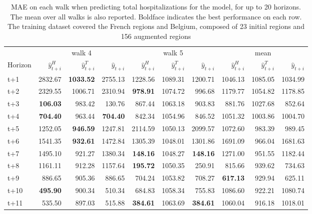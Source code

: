 \begin{table}[H]
\centering
\caption{MAE on each walk when predicting total hospitalizations for the model, for up to 20 horizons. The mean over all walks is also reported. Boldface indicates the best performance on each row. The training dataset covered the French regions and Belgium, composed of 23 initial regions and 156 augmented regions }
\label{tab:MAE_walk_assemble}
\begin{tabular}{lrrrrrrrrr}
\toprule
 & \multicolumn{3}{c}{walk 4} & \multicolumn{3}{c}{walk 5} & \multicolumn{3}{c}{mean} 
\\

\cmidrule(lr){2-4} \cmidrule(lr){5-7} \cmidrule(lr){8-10} 
Horizon & $\hat{y}_{t+i}^H$ & $\hat{y}_{t+i}^T$ & $\hat{y}_{t+i}$ & $\hat{y}_{t+i}^H$ & $\hat{y}_{t+i}^T$ & $\hat{y}_{t+i}$ & $\hat{y}_{t+i}^H$ & $\hat{y}_{t+i}^T$ & $\hat{y}_{t+i}$ \\
\midrule
t+1  & 2832.67  & \textbf{1033.52}  & 2755.13  & 1228.56  & 1089.31  & 1200.71  & 1046.13  & 1085.05  & 1034.99  \\
t+2  & 2329.55  & 1006.71  & 2310.94  & \textbf{978.91}  & 1074.72  & 996.68  & 1179.77  & 1054.82  & 1178.85  \\
t+3  & \textbf{106.03}  & 983.42  & 130.76  & 867.44  & 1063.18  & 903.83  & 881.76  & 1027.68  & 852.64  \\
t+4  & \textbf{704.40}  & 963.44  & \textbf{704.40}  & 842.34  & 1054.96  & 846.52  & 1051.32  & 1003.86  & 1004.70  \\
t+5  & 1252.05  & \textbf{946.59}  & 1247.81  & 2114.59  & 1050.13  & 2099.57  & 1072.60  & 983.39  & 989.45  \\
t+6  & 1541.35  & \textbf{932.61}  & 1472.84  & 1305.39  & 1048.01  & 1301.86  & 1691.09  & 966.04  & 1681.63  \\
t+7  & 1495.10  & 921.27  & 1380.34  & \textbf{148.16}  & 1048.27  & \textbf{148.16}  & 1271.00  & 951.55  & 1182.44  \\
t+8  & 1161.11  & 912.28  & 1157.64  & \textbf{195.72}  & 1050.35  & 250.91  & 815.66  & 939.62  & 734.63  \\
t+9  & 886.65  & 905.36  & 886.65  & 704.24  & 1053.82  & 708.27  & \textbf{617.13}  & 929.94  & 625.11  \\
t+10  & \textbf{495.90}  & 900.34  & 510.34  & 684.83  & 1058.34  & 755.83  & 1086.60  & 922.21  & 1080.74  \\
t+11  & 535.50  & 897.03  & 515.88  & \textbf{384.61}  & 1063.69  & \textbf{384.61}  & 1060.04  & 916.18  & 1018.01  \\

\end{tabular}
\end{table}
